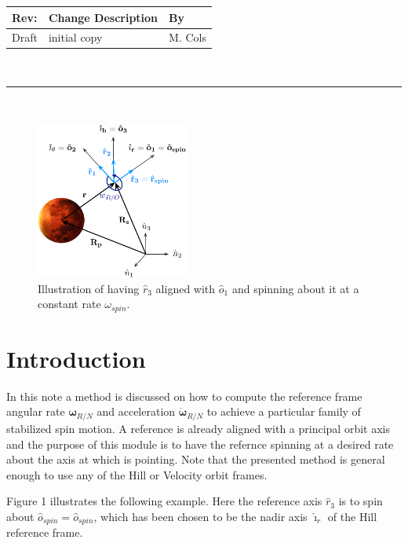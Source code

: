 \documentclass[]{AVSSimReportMemo}
\begin{document}
\makeCover


%
%
\pagestyle{empty}
{\renewcommand{\arraystretch}{2}
\noindent
\begin{longtable}{|p{0.5in}|p{4.5in}|p{1.14in}|}
\hline
{\bfseries Rev}: & {\bfseries Change Description} & {\bfseries By} \\
\hline
Draft & initial copy & M. Cols \\
\hline

\end{longtable}
}

\newpage
\setcounter{page}{1}
\pagestyle{fancy}

\tableofcontents
~\\ \hrule ~\\

\begin{figure}[htb]
	\centerline{
	\includegraphics[width=5cm]{Figures/orbitSpin}
	}
	\caption{Illustration of having $\hat{r}_{3}$ aligned with $\hat{o}_{1}$ and spinning about it at a constant rate $\omega_{spin}$.}
	\label{fig:Fig1}
\end{figure}

\section{Introduction}
In this note a method is discussed on how to compute the reference frame angular rate $\bm\omega_{R/N}$ and acceleration $\dot{\bm\omega}_{R/N}$ to achieve a particular family of stabilized spin motion. A reference is already aligned with a principal orbit axis and the purpose of this module is to have the refernce spinning at a desired rate about the axis at which is pointing. Note that the presented method is general enough to use any of the Hill or Velocity orbit frames.\par
Figure 1 illustrates the following example. Here the reference axis $\hat{r}_{3}$ is to spin about $\hat{o}_{spin} = \hat{o}_{spin}$, which has been chosen to be the nadir axis $\hat{\imath}_{r}$ of the Hill reference frame.
\end{document}
